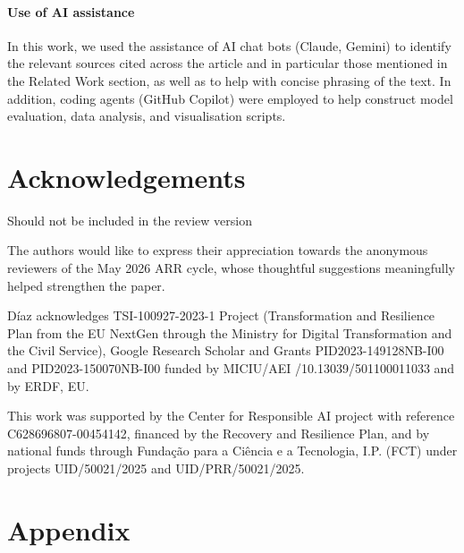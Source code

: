 \documentclass[11pt]{article}
\begin{document}
\paragraph{Use of AI assistance}
In this work, we used the assistance of AI chat bots (Claude, Gemini) to identify the relevant sources cited across the article and in particular those mentioned in the Related Work section, as well as to help with concise phrasing of the text. In addition, coding agents (GitHub Copilot) were employed to help construct model evaluation, data analysis, and visualisation scripts.

\section*{Acknowledgements}
Should not be included in the review version

The authors would like to express their appreciation towards the anonymous reviewers of the May 2026 ARR cycle, whose thoughtful suggestions meaningfully helped strengthen the paper.

Díaz acknowledges TSI-100927-2023-1 Project (Transformation and Resilience Plan from the EU NextGen through the Ministry for Digital Transformation and the Civil Service), Google Research Scholar and Grants PID2023-149128NB-I00 and PID2023-150070NB-I00 funded by MICIU/AEI /10.13039/501100011033 and by ERDF, EU.

This work was supported by the Center for Responsible AI project with reference C628696807-00454142, financed by the Recovery and Resilience Plan, and by national funds through Fundação para a Ciência e a Tecnologia, I.P. (FCT) under projects UID/50021/2025 and UID/PRR/50021/2025.

%



\section*{Appendix}
\appendix

\end{document}
